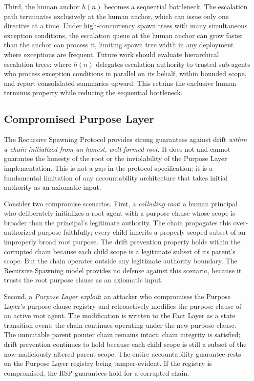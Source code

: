 Third, the human anchor $h(n)$ becomes a sequential bottleneck. The escalation path terminates exclusively at the human anchor, which can issue only one directive at a time. Under high-concurrency spawn trees with many simultaneous exception conditions, the escalation queue at the human anchor can grow faster than the anchor can process it, limiting spawn tree width in any deployment where exceptions are frequent. Future work should evaluate hierarchical escalation trees: where $h(n)$ delegates escalation authority to trusted sub-agents who process exception conditions in parallel on its behalf, within bounded scope, and report consolidated summaries upward. This retains the exclusive human terminus property while reducing the sequential bottleneck.

\subsection{Compromised Purpose Layer}
\label{sec:purpose-compromise}

The Recursive Spawning Protocol provides strong guarantees against drift \emph{within a chain initialized from an honest, well-formed root}. It does not and cannot guarantee the honesty of the root or the inviolability of the Purpose Layer implementation. This is not a gap in the protocol specification; it is a fundamental limitation of any accountability architecture that takes initial authority as an axiomatic input.

Consider two compromise scenarios. First, a \emph{colluding root}: a human principal who deliberately initializes a root agent with a purpose clause whose scope is broader than the principal's legitimate authority. The chain propagates this over-authorized purpose faithfully; every child inherits a properly scoped subset of an improperly broad root purpose. The drift prevention property holds within the corrupted chain because each child scope is a legitimate subset of its parent's scope. But the chain operates outside any legitimate authority boundary. The Recursive Spawning model provides no defense against this scenario, because it trusts the root purpose clause as an axiomatic input.

Second, a \emph{Purpose Layer exploit}: an attacker who compromises the Purpose Layer's purpose clause registry and retroactively modifies the purpose clause of an active root agent. The modification is written to the Fact Layer as a state transition event; the chain continues operating under the new purpose clause. The immutable parent pointer chain remains intact; chain integrity is satisfied; drift prevention continues to hold because each child scope is still a subset of the now-maliciously altered parent scope. The entire accountability guarantee rests on the Purpose Layer registry being tamper-evident. If the registry is compromised, the RSP guarantees hold for a corrupted chain.

